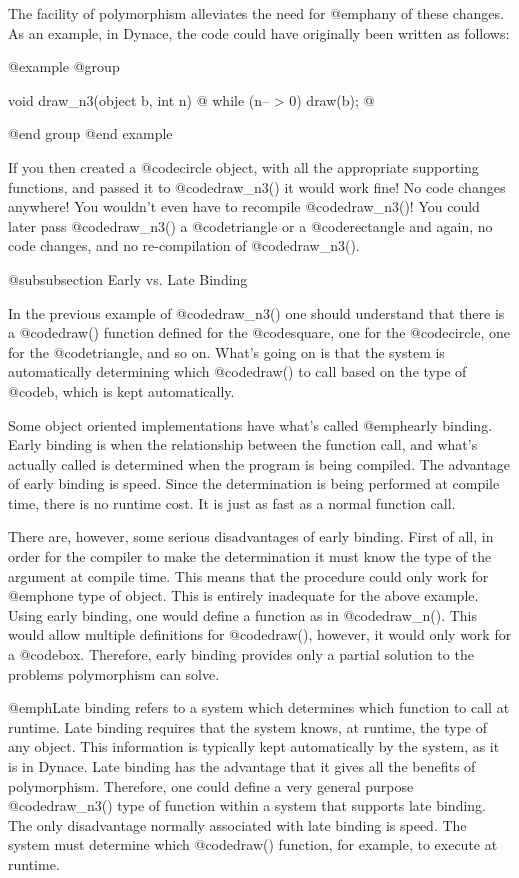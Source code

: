 The facility of polymorphism alleviates the need for @emph{any} of these
changes.  As an example, in Dynace, the code could have originally been
written as follows:

@example
@group

void    draw_n3(object b, int n)
@{
        while (n-- > 0)
                draw(b);
@}

@end group
@end example

If you then created a @code{circle} object, with all the appropriate supporting
functions, and passed it to @code{draw_n3()} it would work fine!  No code
changes anywhere!  You wouldn't even have to recompile @code{draw_n3()}!
You could later pass @code{draw_n3()} a @code{triangle} or a @code{rectangle}
and again, no code changes, and no re-compilation of @code{draw_n3()}.

@subsubsection Early vs. Late Binding

In the previous example of @code{draw_n3()} one should understand that
there is a @code{draw()} function defined for the @code{square}, one for the
@code{circle}, one for the @code{triangle}, and so on.  What's going on is that
the system is automatically determining which @code{draw()} to call based
on the type of @code{b}, which is kept automatically.

Some object oriented implementations have what's called @emph{early binding}.
Early binding is when the relationship between the function call, and
what's actually called is determined when the program is being compiled.
The advantage of early binding is speed.  Since the determination is being
performed at compile time, there is no runtime cost.  It is just as fast
as a normal function call.

There are, however, some serious disadvantages of early binding.  First
of all, in order for the compiler to make the determination it must know
the type of the argument at compile time.  This means that the procedure
could only work for @emph{one} type of object.  This is entirely
inadequate for the above example.  Using early binding, one would
define a function as in @code{draw_n()}.  This would allow multiple
definitions for @code{draw()}, however, it would only work for a
@code{box}.  Therefore, early binding provides only a partial solution to
the problems polymorphism can solve.

@emph{Late binding} refers to a system which determines which function
to call at runtime.  Late binding requires that the system knows, at
runtime, the type of any object.  This information is typically kept
automatically by the system, as it is in Dynace.  Late binding has the advantage
that it gives all the benefits of polymorphism.  Therefore, one could
define a very general purpose @code{draw_n3()} type of function within a system
that supports late binding.  The only disadvantage normally associated
with late binding is speed. The system must determine which
@code{draw()} function, for example, to execute at runtime.

